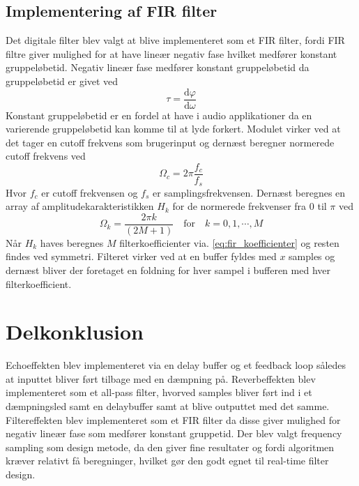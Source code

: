 \subsection{Implementering af FIR filter}
Det digitale filter blev valgt at blive implementeret som et FIR filter, fordi FIR filtre giver mulighed for at have lineær negativ fase hvilket medfører konstant gruppeløbetid.\newline
Negativ lineær fase medfører konstant gruppeløbetid da gruppeløbetid er givet ved
\[
\tau = \frac{\mathrm{d}\varphi}{\mathrm{d}\omega}
\]
Konstant gruppeløbetid er en fordel at have i audio applikationer da en varierende gruppeløbetid kan komme til at lyde forkert.\newline
Modulet virker ved at det tager en cutoff frekvens som brugerinput og dernæst beregner normerede cutoff frekvens ved
\[ \Omega_c = 2\pi\frac{f_c}{f_s} \]
Hvor $f_c$ er cutoff frekvensen og $f_s$ er samplingsfrekvensen.
Dernæst beregnes en array af amplitudekarakteristikken $H_k$ for de normerede frekvenser fra $0$ til $\pi$ ved 
\[ \Omega_k = \frac{2\pi k}{(2M + 1)} \quad \mathrm{for} \quad k = 0, 1, \cdots, M \]
Når $H_k$ haves beregnes $M$ filterkoefficienter via. \ref{eq:fir_koefficienter} og resten findes ved symmetri.\newline
Filteret virker ved at en buffer fyldes med $x$ samples og dernæst bliver der foretaget en foldning for hver sampel i bufferen med hver filterkoefficient.

\section{Delkonklusion}
Echoeffekten blev implementeret via en delay buffer og et feedback loop således at inputtet bliver ført tilbage med en dæmpning på.\newline
Reverbeffekten blev implementeret som et all-pass filter, hvorved samples bliver ført ind i et dæmpningsled samt en delaybuffer samt at blive outputtet med det samme.
Filtereffekten blev implementeret som et FIR filter da disse giver mulighed for negativ lineær fase som medfører konstant gruppetid.
Der blev valgt frequency sampling som design metode, da den giver fine resultater og fordi algoritmen kræver relativt få beregninger, hvilket gør den godt egnet til real-time filter design.
